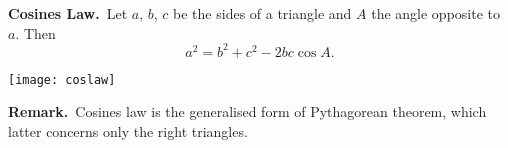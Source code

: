\documentclass[12pt]{article}
\begin{document}
\textbf{Cosines Law.}\, Let $a$, $b$, $c$ be the sides of a triangle and $A$ the angle opposite to $a$. Then 
$$a^2 = b^2+c^2-2bc\cos A.$$

\begin{center}
\texttt{[image: coslaw]}
\end{center}

\textbf{Remark.}\, Cosines law is the generalised form of Pythagorean theorem, which latter concerns only the right triangles.
\end{document}
